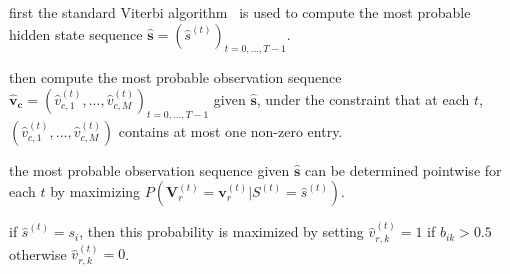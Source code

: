 \begin{frame}
\begin{columns}
  \begin{sitemize}
    \item first the standard Viterbi algorithm~\cite{viterbi1967error} is used to compute the most probable hidden state sequence $\mathbf{\hat{s}} = (\hat{s}^{(t)})_{t = 0,...,T-1}$.
    \item then compute the most probable observation sequence $\mathbf{\hat{v}_c} = (\hat{v}^{(t)}_{c,1},...,\hat{v}^{(t)}_{c,M})_{t = 0,...,T-1}$ given $\mathbf{\hat{s}}$, under the constraint that at each $t$, $(\hat{v}^{(t)}_{c,1},...,\hat{v}^{(t)}_{c,M})$ contains at most one non-zero entry.
    \item the most probable observation sequence given $\mathbf{\hat{s}}$ can be determined pointwise for each $t$ by maximizing $P(\mathbf{V}_r^({t}) = \mathbf{v}_r^{(t)} | S^{(t)} = \hat{s}^{(t)})$.
    \item if $\hat{s}^{(t)} = s_i$, then this probability is maximized by setting $\hat{v}^{(t)}_{r,k} = 1$ if $b_{ik} > 0.5$ otherwise $\hat{v}^{(t)}_{r,k} = 0$.
  \end{sitemize}

\end{columns}

\end{frame}


